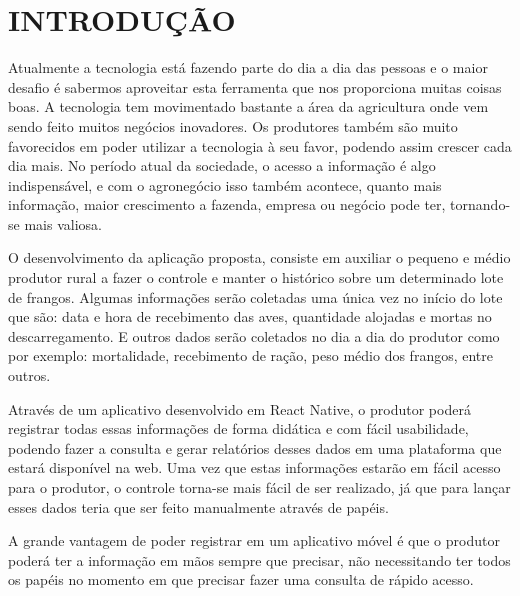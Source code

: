 
\chapter{INTRODUÇÃO}
\label{chap:introducao}


Atualmente a tecnologia está fazendo parte do dia a dia das pessoas e o maior desafio é sabermos aproveitar esta ferramenta que nos proporciona muitas coisas boas. A tecnologia tem movimentado bastante a área da agricultura onde vem sendo feito muitos negócios inovadores. Os produtores também são muito favorecidos em poder utilizar a tecnologia à seu favor, podendo assim crescer cada dia mais. 
No período atual da sociedade, o acesso a informação é algo indispensável, e com o agronegócio isso também acontece, quanto mais informação, maior crescimento a fazenda, empresa ou negócio pode ter, tornando-se mais valiosa. 

O desenvolvimento da aplicação proposta, consiste em auxiliar o pequeno e médio produtor rural a fazer o controle e manter o histórico sobre um determinado lote de frangos. Algumas informações serão coletadas uma única vez no início do lote que são: data e hora de recebimento das aves, quantidade alojadas e mortas no descarregamento. E outros dados serão coletados no dia a dia do produtor como por exemplo: mortalidade, recebimento de ração, peso médio dos frangos, entre outros.

Através de um aplicativo desenvolvido em React Native, o produtor poderá registrar todas essas informações de forma didática e com fácil usabilidade, podendo fazer a consulta e gerar relatórios desses dados em uma plataforma que estará disponível na web.
Uma vez que estas informações estarão em fácil acesso para o produtor, o controle torna-se mais fácil de ser realizado, já que para lançar esses dados teria que ser feito manualmente através de papéis.

A grande vantagem de poder registrar em um aplicativo móvel é que o produtor poderá ter a informação em mãos sempre que precisar, não necessitando ter todos os papéis no momento em que precisar fazer uma consulta de rápido acesso.
